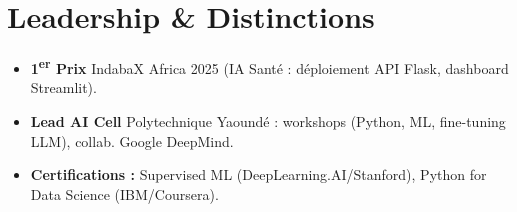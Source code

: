 \documentclass[a4paper,11pt]{article}
\begin{document}
\section{Leadership \& Distinctions}
\begin{itemize}[leftmargin=*, label=\tiny$\bullet$, nosep]
    \item \small{\textbf{1\textsuperscript{er} Prix} IndabaX Africa 2025 (IA Santé : déploiement API Flask, dashboard Streamlit).}
    \item \small{\textbf{Lead AI Cell} Polytechnique Yaoundé : workshops (Python, ML, fine-tuning LLM), collab. Google DeepMind.}
    \item \small{\textbf{Certifications :} Supervised ML (DeepLearning.AI/Stanford), Python for Data Science (IBM/Coursera).}
\end{itemize}
\end{document}

